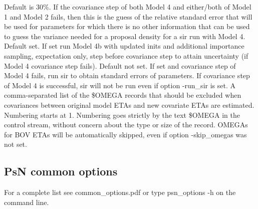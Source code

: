 \begin{optionlist}
\nextopt
{}
Default is 30\%.
If the covariance step of both Model 4 and either/both of Model 1 and Model 2 fails, then this is the guess of the
relative standard error that will be used for parameters for which there is no other information that can be used
to guess the variance needed for a proposal density for a sir run with Model 4.
\nextopt
{}
Default set. If set run Model 4b with updated inits and additional importance sampling, expectation only,
step before covariance step to attain uncertainty (if Model 4 covariance step fails).
Default not set. If set and covariance step of Model 4 fails, run sir to obtain standard errors of parameters.
If covariance step of Model 4 is successful, sir will not be run even if option -run\_sir is set.
\nextopt
{}
A comma-separated list of the \$OMEGA records that should be excluded when covariances
between original model ETAs and new covariate ETAs are estimated. Numbering starts at 1.
Numbering goes strictly by the text \$OMEGA in the control stream, without concern
about the type or size of the record. OMEGAs for BOV ETAs will be automatically skipped,
even if option -skip\_omegas was not set.
\nextopt
\end{optionlist}

\subsection{PsN common options}
For a complete list see common\_options.pdf or type psn\_options -h on the command line.

